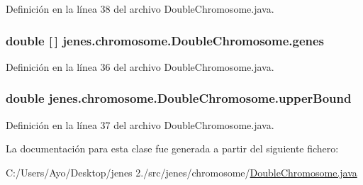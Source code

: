 Definición en la línea 38 del archivo Double\-Chromosome.\-java.

\hypertarget{classjenes_1_1chromosome_1_1_double_chromosome_a0a987b7f1fa1c4cec652330ad77b6ba6}{
\subsubsection[{genes}]{\setlength{\rightskip}{0pt plus 5cm}double \mbox{[}$\,$\mbox{]} jenes.\-chromosome.\-Double\-Chromosome.\-genes\hspace{0.3cm}{\ttfamily [protected]}}}\label{classjenes_1_1chromosome_1_1_double_chromosome_a0a987b7f1fa1c4cec652330ad77b6ba6}


Definición en la línea 36 del archivo Double\-Chromosome.\-java.

\hypertarget{classjenes_1_1chromosome_1_1_double_chromosome_a56362107033b220e75d83b75ea91b74e}{
\subsubsection[{upper\-Bound}]{\setlength{\rightskip}{0pt plus 5cm}double jenes.\-chromosome.\-Double\-Chromosome.\-upper\-Bound\hspace{0.3cm}{\ttfamily [protected]}}}\label{classjenes_1_1chromosome_1_1_double_chromosome_a56362107033b220e75d83b75ea91b74e}


Definición en la línea 37 del archivo Double\-Chromosome.\-java.



La documentación para esta clase fue generada a partir del siguiente fichero\-:\begin{DoxyCompactItemize}
\item 
C\-:/\-Users/\-Ayo/\-Desktop/jenes 2./src/jenes/chromosome/\hyperlink{_double_chromosome_8java}{Double\-Chromosome.\-java}\end{DoxyCompactItemize}
